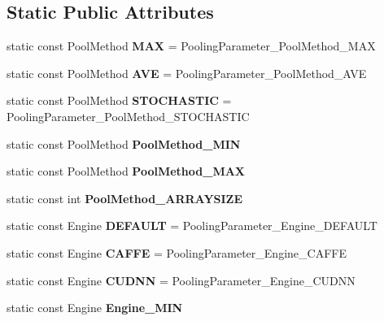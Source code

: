 \subsection*{Static Public Attributes}
\begin{DoxyCompactItemize}
\item 
\mbox{\label{classcaffe_1_1_pooling_parameter_a5e2182e0e87a83af30664c1b6ab6d081}} 
static const Pool\+Method {\bfseries M\+AX} = Pooling\+Parameter\+\_\+\+Pool\+Method\+\_\+\+M\+AX
\item 
\mbox{\label{classcaffe_1_1_pooling_parameter_a19e328b34143bd53e2c0adc15548aa69}} 
static const Pool\+Method {\bfseries A\+VE} = Pooling\+Parameter\+\_\+\+Pool\+Method\+\_\+\+A\+VE
\item 
\mbox{\label{classcaffe_1_1_pooling_parameter_af585c543c36c1106365147a5145c60ab}} 
static const Pool\+Method {\bfseries S\+T\+O\+C\+H\+A\+S\+T\+IC} = Pooling\+Parameter\+\_\+\+Pool\+Method\+\_\+\+S\+T\+O\+C\+H\+A\+S\+T\+IC
\item 
static const Pool\+Method {\bfseries Pool\+Method\+\_\+\+M\+IN}
\item 
static const Pool\+Method {\bfseries Pool\+Method\+\_\+\+M\+AX}
\item 
static const int {\bfseries Pool\+Method\+\_\+\+A\+R\+R\+A\+Y\+S\+I\+ZE}
\item 
\mbox{\label{classcaffe_1_1_pooling_parameter_af6ed98a20183f4671fd79b8d375503dd}} 
static const Engine {\bfseries D\+E\+F\+A\+U\+LT} = Pooling\+Parameter\+\_\+\+Engine\+\_\+\+D\+E\+F\+A\+U\+LT
\item 
\mbox{\label{classcaffe_1_1_pooling_parameter_a94f75f50faf58164a04e1cdfe9cdb8b3}} 
static const Engine {\bfseries C\+A\+F\+FE} = Pooling\+Parameter\+\_\+\+Engine\+\_\+\+C\+A\+F\+FE
\item 
\mbox{\label{classcaffe_1_1_pooling_parameter_ad9f06014b4e164191d57dee96427a210}} 
static const Engine {\bfseries C\+U\+D\+NN} = Pooling\+Parameter\+\_\+\+Engine\+\_\+\+C\+U\+D\+NN
\item 
static const Engine {\bfseries Engine\+\_\+\+M\+IN}

\end{DoxyCompactItemize}

